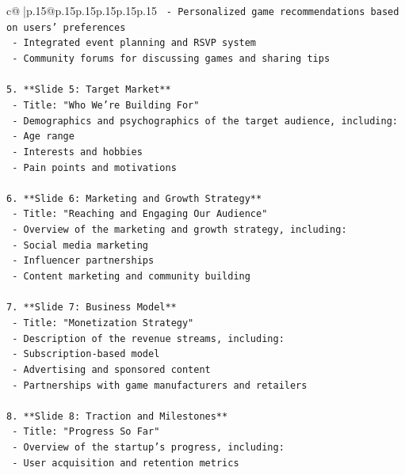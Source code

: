 \documentclass{article}
\begin{document}
{\begin{supertabular}{c@{$\;$}|p{.15\linewidth}@{}p{.15\linewidth}p{.15\linewidth}p{.15\linewidth}p{.15\linewidth}p{.15\linewidth}}
{{{\texttt{     {-} Personalized game recommendations based on users' preferences} \\
\texttt{     {-} Integrated event planning and RSVP system} \\
\texttt{     {-} Community forums for discussing games and sharing tips} \\
\\ 
\texttt{5. **Slide 5: Target Market**} \\
\texttt{   {-} Title: "Who We're Building For"} \\
\texttt{   {-} Demographics and psychographics of the target audience, including:} \\
\texttt{     {-} Age range} \\
\texttt{     {-} Interests and hobbies} \\
\texttt{     {-} Pain points and motivations} \\
\\ 
\texttt{6. **Slide 6: Marketing and Growth Strategy**} \\
\texttt{   {-} Title: "Reaching and Engaging Our Audience"} \\
\texttt{   {-} Overview of the marketing and growth strategy, including:} \\
\texttt{     {-} Social media marketing} \\
\texttt{     {-} Influencer partnerships} \\
\texttt{     {-} Content marketing and community building} \\
\\ 
\texttt{7. **Slide 7: Business Model**} \\
\texttt{   {-} Title: "Monetization Strategy"} \\
\texttt{   {-} Description of the revenue streams, including:} \\
\texttt{     {-} Subscription{-}based model} \\
\texttt{     {-} Advertising and sponsored content} \\
\texttt{     {-} Partnerships with game manufacturers and retailers} \\
\\ 
\texttt{8. **Slide 8: Traction and Milestones**} \\
\texttt{   {-} Title: "Progress So Far"} \\
\texttt{   {-} Overview of the startup's progress, including:} \\
\texttt{     {-} User acquisition and retention metrics} \\
}}}
\end{supertabular}}
\end{document}
